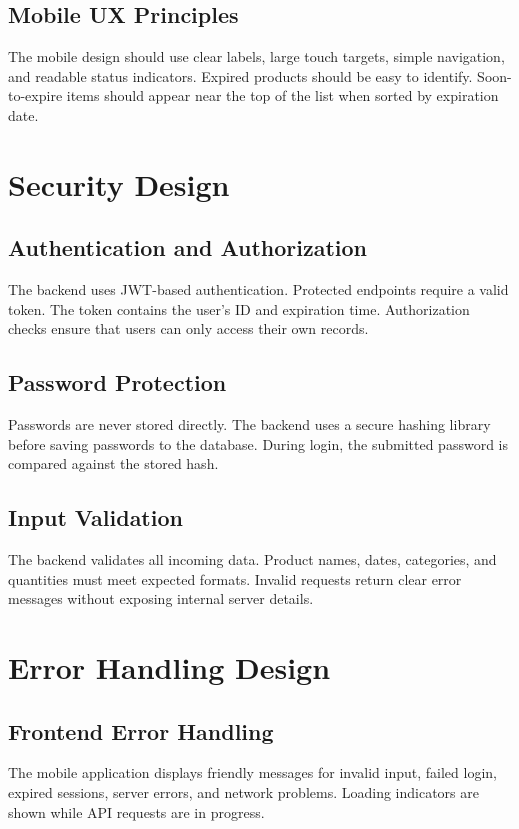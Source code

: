 \documentclass[12pt]{article}
\begin{document}
\subsection{Mobile UX Principles}
The mobile design should use clear labels, large touch targets, simple navigation, and readable status indicators. Expired products should be easy to identify. Soon-to-expire items should appear near the top of the list when sorted by expiration date.

\section{Security Design}

\subsection{Authentication and Authorization}
The backend uses JWT-based authentication. Protected endpoints require a valid token. The token contains the user's ID and expiration time. Authorization checks ensure that users can only access their own records.

\subsection{Password Protection}
Passwords are never stored directly. The backend uses a secure hashing library before saving passwords to the database. During login, the submitted password is compared against the stored hash.

\subsection{Input Validation}
The backend validates all incoming data. Product names, dates, categories, and quantities must meet expected formats. Invalid requests return clear error messages without exposing internal server details.

\section{Error Handling Design}

\subsection{Frontend Error Handling}
The mobile application displays friendly messages for invalid input, failed login, expired sessions, server errors, and network problems. Loading indicators are shown while API requests are in progress.
\end{document}
